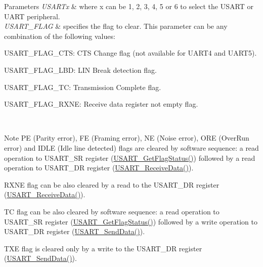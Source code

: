 \begin{DoxyParams}{Parameters}
{\em U\+S\+A\+R\+Tx} & where x can be 1, 2, 3, 4, 5 or 6 to select the U\+S\+A\+RT or U\+A\+RT peripheral. \\
\hline
{\em U\+S\+A\+R\+T\+\_\+\+F\+L\+AG} & specifies the flag to clear. This parameter can be any combination of the following values\+: \begin{DoxyItemize}
\item U\+S\+A\+R\+T\+\_\+\+F\+L\+A\+G\+\_\+\+C\+TS\+: C\+TS Change flag (not available for U\+A\+R\+T4 and U\+A\+R\+T5). \item U\+S\+A\+R\+T\+\_\+\+F\+L\+A\+G\+\_\+\+L\+BD\+: L\+IN Break detection flag. \item U\+S\+A\+R\+T\+\_\+\+F\+L\+A\+G\+\_\+\+TC\+: Transmission Complete flag. \item U\+S\+A\+R\+T\+\_\+\+F\+L\+A\+G\+\_\+\+R\+X\+NE\+: Receive data register not empty flag.\end{DoxyItemize}
\\
\hline
\end{DoxyParams}
\begin{DoxyNote}{Note}
PE (Parity error), FE (Framing error), NE (Noise error), O\+RE (Over\+Run error) and I\+D\+LE (Idle line detected) flags are cleared by software sequence\+: a read operation to U\+S\+A\+R\+T\+\_\+\+SR register (\hyperlink{group___u_s_a_r_t___group9_ga144630722defc9e312f0ad280b68e9da}{U\+S\+A\+R\+T\+\_\+\+Get\+Flag\+Status()}) followed by a read operation to U\+S\+A\+R\+T\+\_\+\+DR register (\hyperlink{group___u_s_a_r_t___group2_gac67a91845b0b1d54d31bdfb1c5e9867c}{U\+S\+A\+R\+T\+\_\+\+Receive\+Data()}). 

R\+X\+NE flag can be also cleared by a read to the U\+S\+A\+R\+T\+\_\+\+DR register (\hyperlink{group___u_s_a_r_t___group2_gac67a91845b0b1d54d31bdfb1c5e9867c}{U\+S\+A\+R\+T\+\_\+\+Receive\+Data()}). 

TC flag can be also cleared by software sequence\+: a read operation to U\+S\+A\+R\+T\+\_\+\+SR register (\hyperlink{group___u_s_a_r_t___group9_ga144630722defc9e312f0ad280b68e9da}{U\+S\+A\+R\+T\+\_\+\+Get\+Flag\+Status()}) followed by a write operation to U\+S\+A\+R\+T\+\_\+\+DR register (\hyperlink{group___u_s_a_r_t___group2_ga0b43d42da9540f446d494bf69823c6fb}{U\+S\+A\+R\+T\+\_\+\+Send\+Data()}). 

T\+XE flag is cleared only by a write to the U\+S\+A\+R\+T\+\_\+\+DR register (\hyperlink{group___u_s_a_r_t___group2_ga0b43d42da9540f446d494bf69823c6fb}{U\+S\+A\+R\+T\+\_\+\+Send\+Data()}).
\end{DoxyNote}

